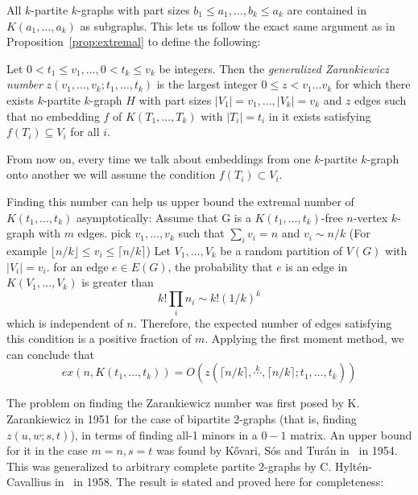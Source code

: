 \begin{remark}
    All $k$-partite $k$-graphs with part sizes $b_1 \leq a_1, \dots, b_k \leq a_k$
    are contained in $K(a_1, \dots, a_k)$ as subgraphs.
    This lets us follow the exact same argument as in Proposition~\ref{prop:extremal}
    to define the following:
\end{remark}

\begin{definition}\label{def:zarankiewicz}
    Let $0 < t_1 \leq v_1, \dots, 0 < t_k \leq v_k$ be integers.
    Then the \emph{generalized Zarankiewicz number} $z(v_1, \dots, v_k; t_1, \dots, t_k)$
    is the largest integer $0 \leq z < v_1  \dots v_k$ for which there exists $k$-partite $k$-graph
    $H$ with part sizes $ |V_1| = v_1, \dots, |V_k| = v_k$ and $z$ edges
    such that no embedding $f$ of $K(T_1, \dots, T_k)$ with $|T_i| = t_i$ in it exists
    satisfying $f(T_i) \subseteq V_i$ for all $i$.
\end{definition}

From now on, every time we talk about embeddings from one $k$-partite $k$-graph
onto another we will assume the condition $f(T_i) \subset V_i$.

\begin{remark}\label{rem:zar_vs_turan}
    Finding this number can help us upper bound the extremal number of $K(t_1, \dots, t_k)$ asymptotically:
    Assume that G is a $K(t_1, \dots, t_k)$-free $n$-vertex $k$-graph with $m$ edges.
    pick $v_1, \dots, v_k$ such that $\sum_{i} v_i = n $ and $v_i \sim n/k $
    (For example $\lfloor n/k \rfloor \leq v_i \leq \lceil n/k \rceil$)
    Let $V_1, \dots, V_k$ be a random partition of $V(G)$ with $|V_i| = v_i$.
    for an edge $e \in E(G)$, the probability that $e$ is an edge in $K(V_1, \dots, V_k)$ is
    greater than
    \[k! \prod_i n_i \sim k! (1/k)^k\]
    which is independent of $n$.
    Therefore, the expected number of edges satisfying this condition is a positive fraction of $m$.
    Applying the first moment method, we can conclude that
    \[ex(n, K(t_1, \dots, t_k)) = O(z(\lceil n / k \rceil , \overset{k}{\cdots}, \lceil n / k \rceil; t_1, \dots, t_k))\]

\end{remark}


The problem on finding the Zarankiewicz number was first posed by K. Zarankiewicz in 1951 for the
case of bipartite 2-graphs (that is, finding $z(u, w; s, t)$),
in terms of finding all-1 minors in a $0-1$ matrix.
An upper bound for it in the case $m=n, s=t$ was found by Kővari, Sós and Turán in~\cite{Kovari1954} in 1954.
This was generalized to arbitrary complete
partite 2-graphs by C. Hyltén-Cavallius in~\cite{Hylten1958}
in 1958.
The result is stated and proved here for completeness:

